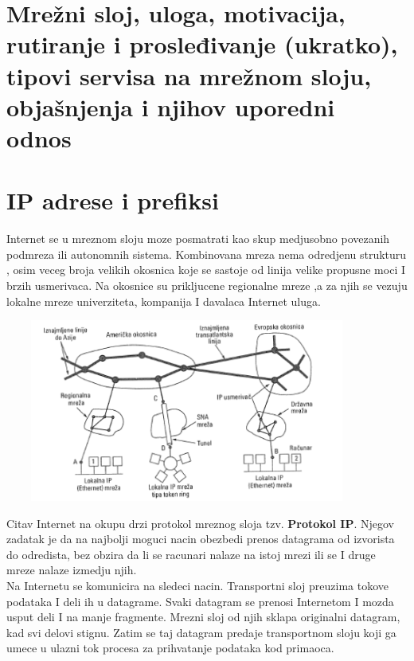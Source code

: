 \documentclass{article} %
\begin{document}
\section{Mrežni sloj, uloga, motivacija, rutiranje i prosleđivanje (ukratko), tipovi servisa na mrežnom sloju, objašnjenja i njihov uporedni odnos}



\section{IP adrese i prefiksi}
Internet se u mreznom sloju moze posmatrati kao skup medjusobno povezanih podmreza ili autonomnih sistema. Kombinovana mreza nema odredjenu strukturu , osim veceg broja velikih okosnica koje se sastoje od linija velike propusne moci I brzih usmerivaca. Na okosnice su prikljucene regionalne mreze ,a za njih se vezuju lokalne mreze univerziteta, kompanija I davalaca Internet uluga.\\

\begin{center}
\includegraphics[width=12cm, height=6cm]{okosnica}\\
\end{center}
Citav Internet na okupu drzi protokol mreznog sloja tzv. \textbf{Protokol IP}. Njegov zadatak je da na najbolji moguci nacin obezbedi prenos datagrama od izvorista do odredista, bez obzira da li se racunari nalaze na istoj mrezi ili se I druge mreze nalaze izmedju njih.\\

Na Internetu se komunicira na sledeci nacin. Transportni sloj preuzima tokove podataka I deli ih u datagrame. Svaki datagram se prenosi Internetom I mozda usput deli I na  manje fragmente. Mrezni sloj od njih sklapa originalni datagram, kad svi delovi stignu. Zatim se taj datagram predaje transportnom sloju koji ga umece u ulazni tok procesa za prihvatanje podataka kod primaoca.\\
\end{document}
